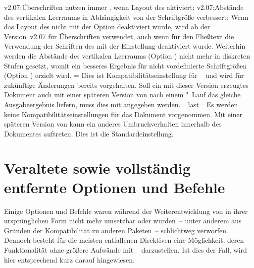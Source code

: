 \begin{Entity}{}
\begin{Declaration}
\begin{DeclareValues}
{    v2.07:Überschriften nutzen immer \OpenSans, wenn Layout des \CDs aktiviert;%
    v2.07:Abstände des vertikalen Leerraums in Abhängigkeit von der 
      Schriftgröße verbessert;%
  }%
  Wenn das Layout des \CDs nicht mit der Option  deaktiviert 
  wurde, wird ab der Version~v2.07 für Überschriften \OpenSans verwendet, auch 
  wenn für den Fließtext die Verwendung der Schriften des \CDs mit der 
  Einstellung  deaktiviert wurde. Weiterhin werden die 
  Abstände des vertikalen Leerraums (Option ) nicht 
  mehr in diskreten Stufen gesetzt, womit ein besseres Ergebnis für nicht 
  vordefinierte Schriftgrößen (Option ) erzielt wird.
=
  Dies ist Kompatibilitätseinstellung für \TUDScript~\vTUDScript{} und wird für 
  zukünftige Änderungen bereits vorgehalten. Soll ein mit dieser Version 
  erzeugtes Dokument auch mit einer späteren Version von \TUDScript nach einem 
  "~Lauf das gleiche Ausgabeergebnis liefern, muss dies mit 
   angegeben werden.
\itemval=last=
  Es werden keine Kompatibilitätseinstellungen für das Dokument vorgenommen. 
  Mit einer späteren Version von \TUDScript kann ein anderes Umbruchverhalten 
  innerhalb des Dokumentes auftreten. Dies ist die Standardeinstellung.%
\end{DeclareValues}
\end{Declaration}



\section{%
  Veraltete sowie vollständig entfernte Optionen und Befehle%
  \label{sec:cessations}%
}
%
\begin{NoIndexDefault}
Einige Optionen und Befehle waren während der Weiterentwicklung von \TUDScript
in ihrer ursprünglichen Form nicht mehr umsetzbar oder wurden~-- unter anderem 
aus Gründen der Kompatibilität zu anderen Paketen~-- schlichtweg verworfen. 
Dennoch besteht für die meisten entfallenen Direktiven eine Möglichkeit, deren 
Funktionalität ohne größere Aufwände mit \TUDScript~\vTUDScript{} darzustellen. 
Ist dies der Fall, wird hier entsprechend kurz darauf hingewiesen.




\end{NoIndexDefault}
\end{Entity}
